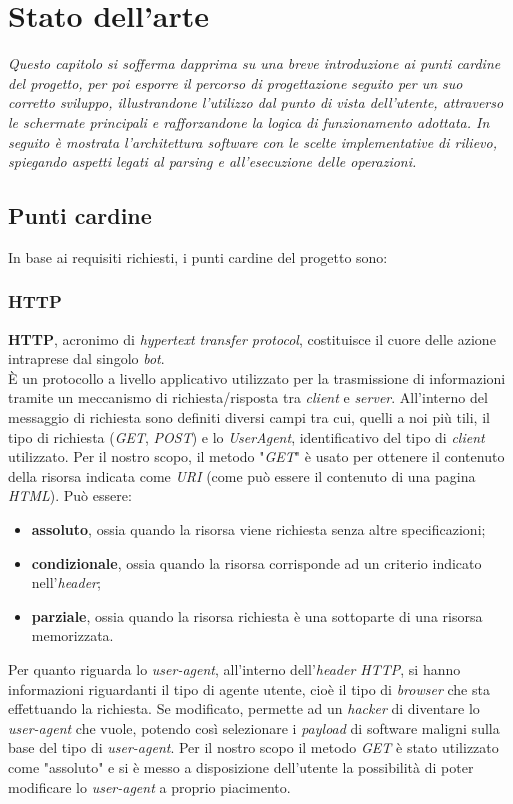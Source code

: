 \chapter{Stato dell'arte}
\begin{minipage}{12cm}\textit{Questo capitolo si sofferma dapprima su una breve introduzione ai punti cardine del progetto, per poi esporre il percorso di progettazione seguito per un suo corretto sviluppo, illustrandone l'utilizzo dal punto di vista dell'utente,  attraverso le schermate principali e rafforzandone la logica di funzionamento adottata. In seguito \`e mostrata l'architettura software con le scelte implementative di rilievo, spiegando aspetti legati al parsing e all'esecuzione delle operazioni.}
\end{minipage}

\vspace*{1cm}
\section{Punti cardine}
In base ai requisiti richiesti, i punti cardine del progetto sono:

\vspace*{0.5cm}
\subsection{HTTP}
\textbf{HTTP}, acronimo di \textit{hypertext transfer protocol}, costituisce il cuore delle azione intraprese dal singolo \textit{bot}.\\
\`E un protocollo a livello applicativo utilizzato per la
trasmissione di informazioni tramite un meccanismo di richiesta/risposta tra \textit{client} e \textit{server}. All'interno del messaggio di richiesta sono definiti diversi campi tra cui, quelli a noi pi\`u tili, il tipo di
richiesta (\textit{GET}, \textit{POST}) e lo \textit{UserAgent}, identificativo del tipo di \textit{client} utilizzato.
Per il nostro scopo, il metodo "\textit{GET}" \`e usato per ottenere il contenuto della risorsa indicata come \textit{URI} (come pu\`o essere il contenuto di una pagina \textit{HTML}). Pu\`o essere:
\begin{itemize}
\item \textbf{assoluto}, ossia quando la risorsa viene richiesta senza altre specificazioni;
\item \textbf{condizionale}, ossia quando la risorsa corrisponde ad un criterio indicato nell'\textit{header};
\item \textbf{parziale}, ossia quando la risorsa richiesta \`e una sottoparte di una risorsa memorizzata.
\end{itemize}
Per quanto riguarda lo \textit{user-agent}, all'interno dell'\textit{header HTTP}, si hanno informazioni riguardanti il tipo di agente utente, cio\`e il tipo di \textit{browser} che sta effettuando la richiesta. Se modificato, permette ad un \textit{hacker} di diventare lo \textit{user-agent} che vuole, potendo cos\`i selezionare i \textit{payload} di software maligni sulla base del tipo di \textit{user-agent}. 
Per il nostro scopo il metodo \textit{GET} \`e stato utilizzato come "assoluto" e si \`e messo a disposizione dell'utente la possibilit\`a di poter modificare lo \textit{user-agent} a proprio piacimento.

